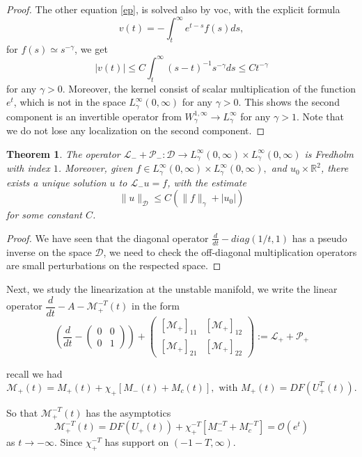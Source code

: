 \documentclass[letterpaper,11pt]{article}
\newcommand{\rmO}{\mathcal{O}}
\numberwithin{equation}{section}
\theoremstyle{plain}
\newtheorem{theorem}{Theorem}[section]
\begin{document}
\begin{proof}
The other equation \eqref{ep}, is solved also by voc, with the explicit formula
\[
v(t) = - \int_t^\infty e^{t-s}f(s)ds,
\]
for $f(s) \simeq s^{-\gamma}$, we get
\[
|v(t)| \le  C\int_t^\infty (s-t)^{-1}s^{-\gamma} ds\le Ct^{-\gamma}
\]
for any $\gamma>0$. Moreover, the kernel consist of scalar multiplication of the function $e^t$, which is not in the space $L_{\gamma}^{\infty}(0,\infty)$ for any $\gamma>0$. This shows the second component is an invertible operator from $W^{1,\infty}_{\gamma} \to L_{\gamma}^\infty$ for any $\gamma>1$. Note that we do not lose any localization on the second component.
\end{proof}

\begin{theorem}
The operator $\mathcal{L}_-+\mathcal{P}_-:\mathcal{D} \to L_{\gamma}^{\infty}(0,\infty) \times L_{\gamma}^{\infty}(0,\infty)$ is Fredholm with index $1$. Moreover, given $f \in L_{\gamma}^{\infty}(0,\infty) \times L_{\gamma}^{\infty}(0,\infty),$ and $u_0 \times \mathbb{R}^2$, there exists a unique solution $u$ to $\mathcal{L}_- u = f$, with the estimate
\[
\| u \|_\mathcal{D} \le C(\|f\|_\gamma + |u_0|)
\]
for some constant $C$.
\end{theorem}
\begin{proof}
We have seen that the diagonal operator $\frac{d}{dt} -diag(1/t, 1)$ has a pseudo inverse on the space $\mathcal{D}$, we need to check the off-diagonal multiplication operators are small perturbations on the respected space.
\end{proof}

Next, we study the linearization at the unstable manifold, we write the linear operator $\dfrac{d}{dt} -A-\mathcal{M}_+^{-T}(t)$ in the form
\[
\left(\dfrac{d}{dt}- \begin{pmatrix}
0 & 0\\
0 &1
\end{pmatrix} \right)+ \begin{pmatrix}
[\mathcal{M}_+]_{11} & [\mathcal{M}_+]_{12} \\
[\mathcal{M}_+]_{21} & [\mathcal{M}_+]_{22}
\end{pmatrix} := \mathcal{L}_+ + \mathcal{P}_+
\]

recall we had
\[
\mathcal{M}_+(t) =  M_+(t) +\chi_+[M_-(t)+M_c(t)], \text{ with } M_+(t) = DF(U_+^T(t)). 
\]

So that $\mathcal{M}_+^{-T}(t)$ has the asymptotics
\[
\mathcal{M}_+^{-T}(t)= DF(U_+(t)) + \chi_+^{-T}[M_-^{-T}+M_c^{-T}] = \rmO(e^t) 
\]
as $t \to -\infty$. Since $\chi_+^{-T}$ has support on $(-1-T, \infty)$.
\end{document}
